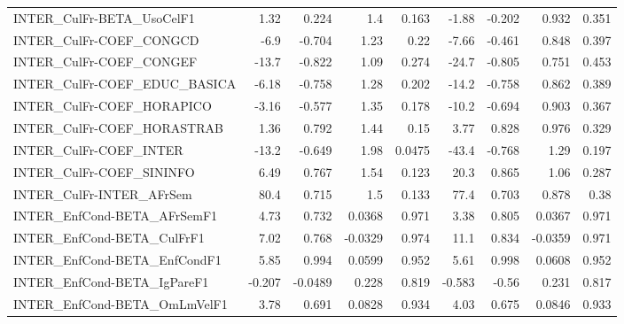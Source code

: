 \begin{tabular}{lrrrrrrrr}
INTER\_CulFr-BETA\_UsoCelF1             &        1.32 &        0.224 &      1.4 &    0.163 &      -1.88 &      -0.202 &        0.932 &         0.351 \\
INTER\_CulFr-COEF\_CONGCD               &        -6.9 &       -0.704 &     1.23 &     0.22 &      -7.66 &      -0.461 &        0.848 &         0.397 \\
INTER\_CulFr-COEF\_CONGEF               &       -13.7 &       -0.822 &     1.09 &    0.274 &      -24.7 &      -0.805 &        0.751 &         0.453 \\
INTER\_CulFr-COEF\_EDUC\_BASICA          &       -6.18 &       -0.758 &     1.28 &    0.202 &      -14.2 &      -0.758 &        0.862 &         0.389 \\
INTER\_CulFr-COEF\_HORAPICO             &       -3.16 &       -0.577 &     1.35 &    0.178 &      -10.2 &      -0.694 &        0.903 &         0.367 \\
INTER\_CulFr-COEF\_HORASTRAB            &        1.36 &        0.792 &     1.44 &     0.15 &       3.77 &       0.828 &        0.976 &         0.329 \\
INTER\_CulFr-COEF\_INTER                &       -13.2 &       -0.649 &     1.98 &   0.0475 &      -43.4 &      -0.768 &         1.29 &         0.197 \\
INTER\_CulFr-COEF\_SININFO              &        6.49 &        0.767 &     1.54 &    0.123 &       20.3 &       0.865 &         1.06 &         0.287 \\
INTER\_CulFr-INTER\_AFrSem              &        80.4 &        0.715 &      1.5 &    0.133 &       77.4 &       0.703 &        0.878 &          0.38 \\
INTER\_EnfCond-BETA\_AFrSemF1           &        4.73 &        0.732 &   0.0368 &    0.971 &       3.38 &       0.805 &       0.0367 &         0.971 \\
INTER\_EnfCond-BETA\_CulFrF1            &        7.02 &        0.768 &  -0.0329 &    0.974 &       11.1 &       0.834 &      -0.0359 &         0.971 \\
INTER\_EnfCond-BETA\_EnfCondF1          &        5.85 &        0.994 &   0.0599 &    0.952 &       5.61 &       0.998 &       0.0608 &         0.952 \\
INTER\_EnfCond-BETA\_IgPareF1           &      -0.207 &      -0.0489 &    0.228 &    0.819 &     -0.583 &       -0.56 &        0.231 &         0.817 \\
INTER\_EnfCond-BETA\_OmLmVelF1          &        3.78 &        0.691 &   0.0828 &    0.934 &       4.03 &       0.675 &       0.0846 &         0.933 \\

\end{tabular}
